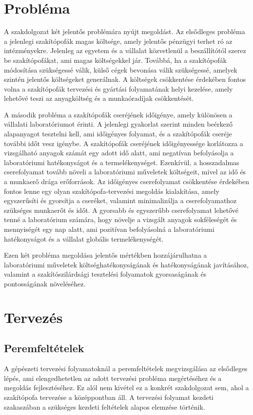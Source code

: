 \documentclass[12pt,a4paper,oneside]{report}
\begin{document}
\chapter{Probléma}
A szakdolgozat két jelentős problémára nyújt megoldást. Az elsődleges probléma a jelenlegi szakítópofák magas költsége, amely jelentős pénzügyi terhet ró az intézményekre. Jelenleg az egyetem és a vállalat közvetlenül a beszállítótól szerez be szakítópofákat, ami magas költségekkel jár. Továbbá, ha a szakítópofák módosítása szükségessé válik, külső cégek bevonása válik szükségessé, amelyek szintén jelentős költségeket generálnak. A költségek csökkentése érdekében fontos volna a szakítópofák tervezési és gyártási folyamatának helyi kezelése, amely lehetővé teszi az anyagköltség és a munkaóradíjak csökkentését.

A második probléma a szakítópofák cseréjének időigénye, amely különösen a vállalati laboratóriumot érinti. A jelenlegi gyakorlat szerint minden beérkező alapanyagot tesztelni kell, ami időigényes folyamat, és a szakítópofák cseréje további időt vesz igénybe. A szakítópofák cseréjének időigényessége korlátozza a vizsgálható anyagok számát egy adott idő alatt, ami negatívan befolyásolja a laboratóriumi hatékonyságot és a termelékenységet. Ezenkívül, a hosszadalmas cserefolyamat tovább növeli a laboratóriumi műveletek költségeit, mivel az idő és a munkaerő drága erőforrások. Az időigényes cserefolyamat csökkentése érdekében fontos lenne egy olyan szakítópofa-tervezési megoldás kialakítása, amely egyszerűsíti és gyorsítja a cseréket, valamint minimalizálja a cserefolyamathoz szükséges munkaerőt és időt. A gyorsabb és egyszerűbb cserefolyamat lehetővé tenné a laboratórium számára, hogy növelje a vizsgált anyagok sokféleségét és mennyiségét egy nap alatt, ami pozitívan befolyásolná a laboratóriumi hatékonyságot és a vállalat globális termelékenységét.

Ezen két probléma megoldása jelentős mértékben hozzájárulhatna a laboratóriumi műveletek költséghatékonyságának és hatékonyságának javításához, valamint a szakítószilárdsági tesztelési folyamatok gyorsaságának és pontosságának növeléséhez.

\chapter{Tervezés}
\section{Peremfeltételek}
A gépészeti tervezési folyamatoknál a peremfeltételek megvizsgálása az elsődleges lépés, ami elengedhetetlen az adott tervezési probléma megértéséhez és a megoldás fejlesztéséhez. Ez alól nem kivétel ez a konkrét szakdolgozat sem, ahol a szakítópofa tervezése a középpontban áll. A tervezési folyamat kezdeti szakaszában a szükséges kezdeti feltételek alapos elemzése történik.
\end{document}
